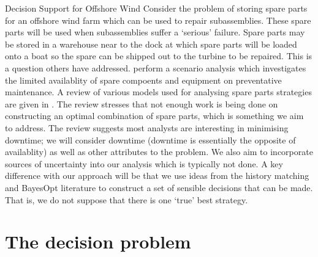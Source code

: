 \begin{chapter}{Decision Support for Offshore Wind \label{Ch:ds-for-ow}}
Consider the problem of storing spare parts for an offshore wind farm which can be used to repair subassemblies. These spare parts will be used when subassemblies suffer a `serious' failure. Spare parts may be stored in a warehouse near to the dock at which spare parts will be loaded onto a boat so the spare can be shipped out to the turbine to be repaired. This is a question others have addressed. \citet{Tracht2013} perform a scenario analysis which investigates the limited availablity of spare compoents and equipment on preventative maintenance. A review of various models used for analysing spare parts strategies are given in \citet{Tusar2022}. The review stresses that not enough work is being done on constructing an optimal combination of spare parts, which is something we aim to address. The review suggests most analysts are interesting in minimising downtime; we will consider downtime (downtime is essentially the opposite of availablity) as well as other attributes to the problem. We also aim to incorporate sources of uncertainty into our analysis which is typically not done. A key difference with our approach will be that we use ideas from the history matching and BayesOpt literature to construct a set of sensible decisions that can be made. That is, we do not suppose that there is one `true' best strategy.

\section{The decision problem}


\end{chapter}
